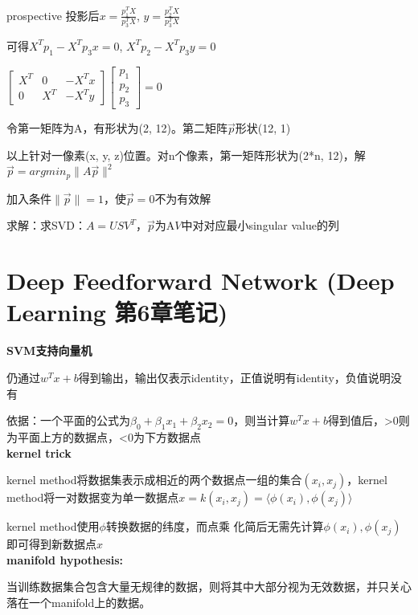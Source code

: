\documentclass[UTF8]{ctexart}
\begin{document}
  prospective 投影后$x = \frac{p_1^TX}{p_3^TX}$, $y = \frac{p_2^TX}{p_3^TX}$

  \quad 可得$X^Tp_1 - X^Tp_3x = 0$, $X^Tp_2 - X^Tp_3y = 0$

  \quad $
    \begin{bmatrix}
      X^T & 0 & -X^Tx \\
      0 & X^T & -X^Ty
      \end{bmatrix}
    \begin{bmatrix}
      p_1 \\
      p_2 \\
      p_3
      \end{bmatrix}
    = 0$

  \quad \quad 令第一矩阵为A，有形状为(2, 12)。第二矩阵$\vec{p}$形状(12, 1)

  \quad 以上针对一像素(x, y, z)位置。对n个像素，第一矩阵形状为(2*n, 12)，解$\vec{p} = argmin_p \|A\vec{p}\|^2$

  \quad \quad 加入条件$\|\vec{p}\| = 1$，使$\vec{p} = 0$不为有效解

  \quad \quad 求解：求SVD：$A = USV^T$，$\vec{p}$为A$V$中对对应最小singular value的列


\section{Deep Feedforward Network (Deep Learning 第6章笔记)}
\noindent \textbf{SVM支持向量机}

  仍通过$w^Tx+b$得到输出，输出仅表示identity，正值说明有identity，负值说明没有

  依据：一个平面的公式为$\beta_0+\beta_1x_1+\beta_2x_2=0$，则当计算$w^Tx+b$得到值后，>0则为平面上方的数据点，<0为下方数据点\\
\textbf{kernel trick}

  kernel method将数据集表示成相近的两个数据点一组的集合$(x_i, x_j)$，kernel method将一对数据变为单一数据点$x=k(x_i, x_j)=\langle \phi (x_i), \phi (x_j)\rangle $

  kernel method使用$\phi $转换数据的纬度，而点乘 化简后无需先计算$\phi (x_i), \phi (x_j)$即可得到新数据点$x$\\
\textbf{manifold hypothesis:}

  当训练数据集合包含大量无规律的数据，则将其中大部分视为无效数据，并只关心落在一个manifold上的数据。
\end{document}

